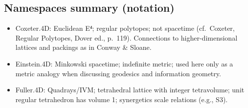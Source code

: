 \documentclass[
  10pt,
]{article}
\providecommand{\tightlist}{%
  \setlength{\itemsep}{0pt}\setlength{\parskip}{0pt}}
\begin{document}
\hypertarget{namespaces-summary-notation}{%
\subsection{Namespaces summary
(notation)}\label{namespaces-summary-notation}}

\begin{itemize}
\tightlist
\item
  Coxeter.4D: Euclidean E⁴; regular polytopes; not spacetime
  (cf.~Coxeter, Regular Polytopes, Dover ed., p.~119). Connections to
  higher-dimensional lattices and packings as in Conway \& Sloane.
\item
  Einstein.4D: Minkowski spacetime; indefinite metric; used here only as
  a metric analogy when discussing geodesics and information geometry.
\item
  Fuller.4D: Quadrays/IVM; tetrahedral lattice with integer tetravolume;
  unit regular tetrahedron has volume 1; synergetics scale relations
  (e.g., S3).
\end{itemize}
\end{document}
